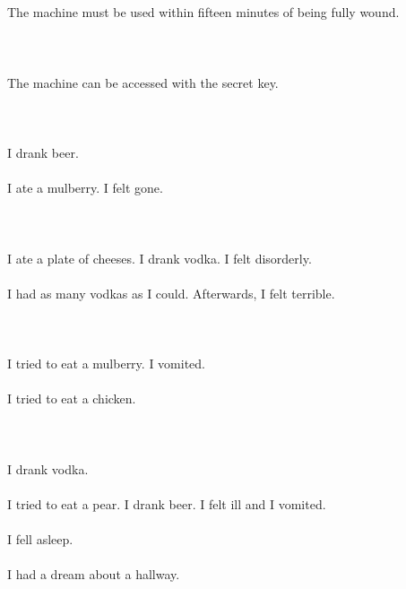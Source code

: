 \documentclass{article}
\begin{document}
    \section{}
    The machine must be used within fifteen minutes of being fully wound.\\\\ 
    \newpage
    
    \section{}
    The machine can be accessed with the secret key.\\\\ 
    \newpage
    
    \section{}
    I drank beer.\\\\I ate a mulberry. I felt gone.\\\\ 
    \newpage
    
    \section{}
    I ate a plate of cheeses. I drank vodka. I felt disorderly.\\\\I had as many vodkas as I could. Afterwards, I felt terrible.\\\\ 
    \newpage
    
    \section{}
    I tried to eat a mulberry. I vomited.\\\\I tried to eat a chicken.\\\\ 
    \newpage
    
    \section{}
    I drank vodka.\\\\I tried to eat a pear. I drank beer. I felt ill and I vomited.\\\\I fell asleep.\\\\I had a dream about a hallway.\\\\ 
    \newpage
    
\end{document}
